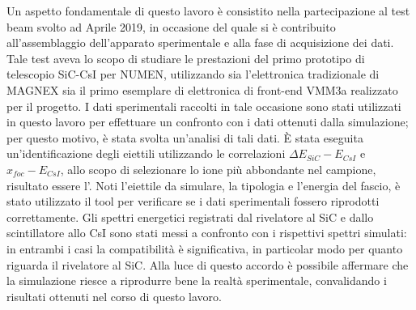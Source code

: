 Un aspetto fondamentale di questo lavoro è consistito nella partecipazione al test beam svolto ad Aprile 2019, in occasione del quale si è contribuito all'assemblaggio dell'apparato sperimentale e alla fase di acquisizione dei dati.
Tale test aveva lo scopo di studiare le prestazioni del primo prototipo di telescopio SiC-CsI per NUMEN, utilizzando sia l'elettronica tradizionale di MAGNEX sia il primo esemplare di elettronica di front-end VMM3a realizzato per il progetto.
I dati sperimentali raccolti in tale occasione sono stati utilizzati in questo lavoro per effettuare un confronto con i dati ottenuti dalla simulazione; per questo motivo, è stata svolta un'analisi di tali dati.
È stata eseguita un'identificazione degli eiettili utilizzando le correlazioni $\Delta E_{SiC} -E_{CsI}$ e $x_{foc} -E_{CsI}$, allo scopo di selezionare lo ione più abbondante nel campione, risultato essere l'.
Noti l'eiettile da simulare, la tipologia e l'energia del fascio, è stato utilizzato il tool per verificare se i dati sperimentali fossero riprodotti correttamente.
Gli spettri energetici registrati dal rivelatore al SiC e dallo scintillatore allo CsI sono stati messi a confronto con i rispettivi spettri simulati: in entrambi i casi la compatibilità è significativa, in particolar modo per quanto riguarda il rivelatore al SiC.
Alla luce di questo accordo è possibile affermare che la simulazione riesce a riprodurre bene la realtà sperimentale, convalidando i risultati ottenuti nel corso di questo lavoro.





